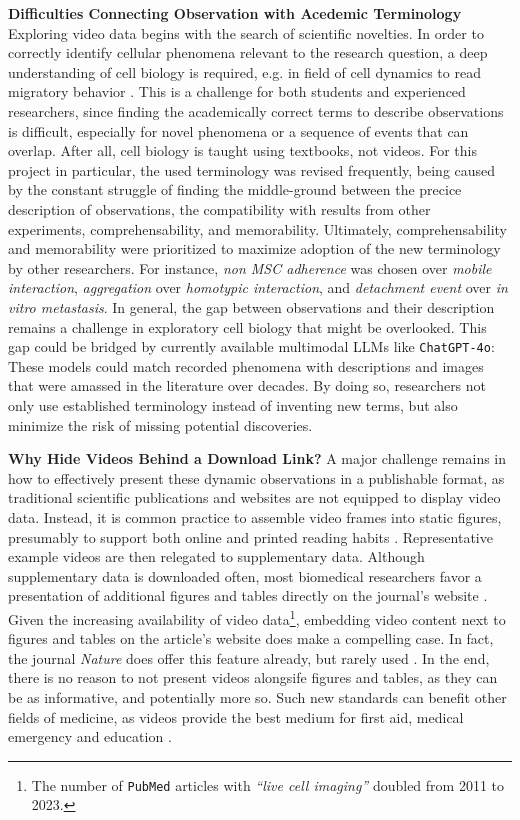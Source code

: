 \textbf{Difficulties Connecting Observation with Acedemic Terminology} Exploring video data
begins with the search of scientific novelties. In order to correctly identify
cellular phenomena relevant to the research question, a deep
understanding of cell biology is required, e.g. in field of cell dynamics to
read migratory behavior \cite{nalbantExploratoryCellDynamics2018}. This is a
challenge for both students and experienced researchers, since finding the
academically correct terms to describe observations is difficult, especially for
novel phenomena or a sequence of events that can overlap. After all, cell
biology is taught using textbooks, not videos. For this project in particular,
the used terminology was revised frequently, being caused by the constant
struggle of finding the middle-ground between the precice description of
observations, the compatibility with results from other experiments,
comprehensability, and memorability. Ultimately, comprehensability and
memorability were prioritized to maximize adoption of the new terminology by
other researchers. For instance, \emph{non MSC adherence} was chosen over
\emph{mobile interaction}, \emph{aggregation} over \emph{homotypic interaction},
and \emph{detachment event} over \emph{in vitro metastasis}. In general, the gap
between observations and their description remains a challenge in exploratory
cell biology that might be overlooked. This gap could be bridged by currently
available multimodal \acp{LLM} like \texttt{ChatGPT-4o}: These models could
match recorded phenomena with descriptions and images that were amassed in the
literature over decades. By doing so, researchers not only use established
terminology instead of inventing new terms, but also minimize the risk of
missing potential discoveries.

\textbf{Why Hide Videos Behind a Download Link?} A major challenge remains in how
to effectively present these dynamic observations in a publishable format, as
traditional scientific publications and websites are not equipped to display
video data. Instead, it is common practice to assemble video frames into static
figures, presumably to support both online and printed reading habits
\cite{perasDigitalPaperReading2023}. Representative example videos are then
relegated to supplementary data. Although supplementary data is downloaded
often, most biomedical researchers favor a presentation of additional figures
and tables directly on the journal's website
\cite{priceRoleSupplementaryMaterial2018}. Given the increasing availability of
video data\footnote{The number of \texttt{PubMed} articles with \emph{``live cell
        imaging''} doubled from 2011 to 2023.}, embedding video content next to figures
and tables on the article's website does make a compelling case. In fact, the
journal \emph{Nature} does offer this feature already, but rarely used
\cite{NatureVideoContent}. In the end, there is no reason to not present videos
alongsife figures and tables, as they can be as informative, and potentially
more so. Such new standards can benefit other fields of medicine, as videos
provide the best medium for first aid, medical emergency and education
\cite{guptaDatasetMedicalInstructional2023}.

